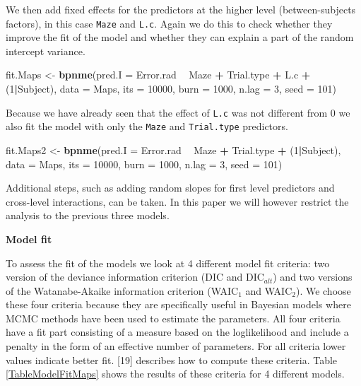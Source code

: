 \documentclass[11pt,]{article}
\newenvironment{Shaded}{\begin{snugshade}}{\end{snugshade}}
\newcommand{\DataTypeTok}[1]{\textcolor[rgb]{0.13,0.29,0.53}{#1}}
\newcommand{\DecValTok}[1]{\textcolor[rgb]{0.00,0.00,0.81}{#1}}
\newcommand{\KeywordTok}[1]{\textcolor[rgb]{0.13,0.29,0.53}{\textbf{#1}}}
\newcommand{\NormalTok}[1]{#1}
\newcommand{\OperatorTok}[1]{\textcolor[rgb]{0.81,0.36,0.00}{\textbf{#1}}}
\newcommand{\StringTok}[1]{\textcolor[rgb]{0.31,0.60,0.02}{#1}}
\begin{document}
We then add fixed effects for the predictors at the higher level
(between-subjects factors), in this case \verb|Maze| and \verb|L.c|.
Again we do this to check whether they improve the fit of the model and
whether they can explain a part of the random intercept variance.

\begin{Shaded}
\begin{Highlighting}[]
\NormalTok{fit.Maps <-}\StringTok{ }\KeywordTok{bpnme}\NormalTok{(}\DataTypeTok{pred.I =}\NormalTok{ Error.rad }\OperatorTok{~}\StringTok{ }\NormalTok{Maze }\OperatorTok{+}\StringTok{ }\NormalTok{Trial.type }\OperatorTok{+}\StringTok{ }\NormalTok{L.c }\OperatorTok{+}\StringTok{ }\NormalTok{(}\DecValTok{1}\OperatorTok{|}\NormalTok{Subject),}
                  \DataTypeTok{data =}\NormalTok{ Maps,}
                  \DataTypeTok{its =} \DecValTok{10000}\NormalTok{, }\DataTypeTok{burn =} \DecValTok{1000}\NormalTok{, }\DataTypeTok{n.lag =} \DecValTok{3}\NormalTok{, }\DataTypeTok{seed =} \DecValTok{101}\NormalTok{)}
\end{Highlighting}
\end{Shaded}

Because we have already seen that the effect of \verb|L.c| was not
different from 0 we also fit the model with only the \verb|Maze| and
\verb|Trial.type| predictors.

\begin{Shaded}
\begin{Highlighting}[]
\NormalTok{fit.Maps2 <-}\StringTok{ }\KeywordTok{bpnme}\NormalTok{(}\DataTypeTok{pred.I =}\NormalTok{ Error.rad }\OperatorTok{~}\StringTok{ }\NormalTok{Maze }\OperatorTok{+}\StringTok{ }\NormalTok{Trial.type }\OperatorTok{+}\StringTok{ }\NormalTok{(}\DecValTok{1}\OperatorTok{|}\NormalTok{Subject),}
                  \DataTypeTok{data =}\NormalTok{ Maps,}
                  \DataTypeTok{its =} \DecValTok{10000}\NormalTok{, }\DataTypeTok{burn =} \DecValTok{1000}\NormalTok{, }\DataTypeTok{n.lag =} \DecValTok{3}\NormalTok{, }\DataTypeTok{seed =} \DecValTok{101}\NormalTok{)}
\end{Highlighting}
\end{Shaded}

Additional steps, such as adding random slopes for first level
predictors and cross-level interactions, can be taken. In this paper we
will however restrict the analysis to the previous three models.

\textbf{Model fit}

To assess the fit of the models we look at 4 different model fit
criteria: two version of the deviance information criterion (DIC and
DIC\(_{alt}\)) and two versions of the Watanabe-Akaike information
criterion (WAIC\(_1\) and WAIC\(_2\)). We choose these four criteria
because they are specifically useful in Bayesian models where MCMC
methods have been used to estimate the parameters. All four criteria
have a fit part consisting of a measure based on the loglikelihood and
include a penalty in the form of an effective number of parameters. For
all criteria lower values indicate better fit. {[}19{]} describes how to
compute these criteria. Table \ref{TableModelFitMaps} shows the results
of these criteria for 4 different models.
\end{document}
